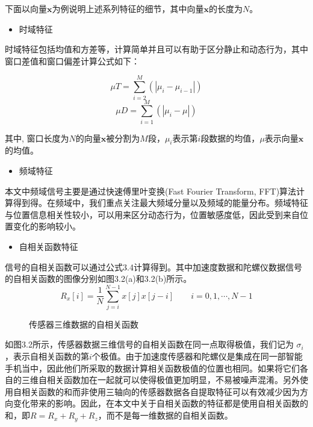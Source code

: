 下面以向量$\textbf{x}$为例说明上述系列特征的细节，其中向量$\textbf{x}$的长度为$N$。
\begin{itemize}
	\item 时域特征
\end{itemize}
\par 时域特征包括均值和方差等，计算简单并且可以有助于区分静止和动态行为，其中窗口差值和窗口偏差计算公式如下：

\begin{equation}
	\mu T = \sum_{i=2}^{M}(|\mu_i - \mu_{i-1}|)
\end{equation}
\begin{equation}
	\mu D = \sum_{i=1}^{M}(|\mu_i - \mu|)
\end{equation}

其中, 窗口长度为$N$的向量$\textbf{x}$被分割为$M$段，$\mu_i$表示第$i$段数据的均值，$\mu$表示向量$\textbf{x}$的均值。

\begin{itemize}
	\item 频域特征
\end{itemize}

\par 本文中频域信号主要是通过快速傅里叶变换(Fast Fourier Transform, FFT)算法计算得到得。在频域中，我们重点关注最大频域分量以及频域的能量分布。频域特征与位置信息相关性较小，可以用来区分动态行为，位置敏感度低，因此受到来自位置变化的影响较小。
\begin{itemize}
	\item 自相关函数特征
\end{itemize}
\par 信号的自相关函数可以通过公式3.4计算得到。其中加速度数据和陀螺仪数据信号的自相关函数的图像分别如图3.2(a)和3.2(b)所示。
\begin{equation}
	R_x[i]=\frac{1}{N}\sum_{j=i}^{N-1} x[j]x[j-i]\qquad  i=0, 1, \cdots, N-1
\end{equation}
\begin{figure}[!htb]
    \centering
    \caption{传感器三维数据的自相关函数}
\end{figure}

\par 如图3.2所示，传感器数据三维信号的自相关函数在同一点取得极值，我们记为 $\sigma_i$，表示自相关函数的第$i$个极值。由于加速度传感器和陀螺仪是集成在同一部智能手机当中，因此他们所采取的数据计算相关函数极值的位置也相同。如果将它们各自的三维自相关函数加在一起就可以使得极值更加明显，不易被噪声混淆。另外使用自相关函数的和而非使用三轴向的传感器数据各自提取特征可以有效减少因为方向变化带来的影响。因此，在本文中关于自相关函数的特征都是使用自相关函数的和，即$R = R_x + R_y + R_z$，而不是每一维数据的自相关函数。

